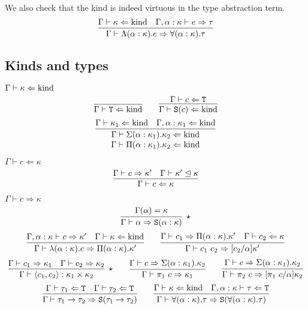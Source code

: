 We also check that the kind is indeed virtuous in the type abstraction term.
\[
  \infer{\Gamma \vdash \Lambda(\alpha : \kappa).e \Rightarrow \forall(\alpha : \kappa).\tau}
    {\Gamma \vdash \kappa \Leftarrow \kind
    &\Gamma, \alpha : \kappa \vdash e \Rightarrow \tau
   }
\]

\subsection{Kinds and types}
\begin{judgment}
  $\Gamma \vdash \kappa \Leftarrow \textnormal{kind}$
  \[
    \infer{\Gamma \vdash \T \Leftarrow \kind}{}
    \qquad
    \infer{\Gamma \vdash \S(c) \Leftarrow \kind}
          {\Gamma \vdash c \Leftarrow \T}
  \]
  \[
    \infer{
      \deduce
        {\Gamma \vdash \Pi(\alpha : \kappa_1).\kappa_2 \Leftarrow \kind}
        {\Gamma \vdash \Sigma(\alpha : \kappa_1).\kappa_2 \Leftarrow \kind}
      }
      {\Gamma \vdash \kappa_1 \Leftarrow \kind
      &\Gamma, \alpha : \kappa_1 \Leftarrow\kind
      }
  \]
\end{judgment}

\begin{judgment}
  $\Gamma \vdash c \Leftarrow \kappa$
  \[
    \infer
      {\Gamma \vdash c \Leftarrow \kappa}
      {\Gamma \vdash c \Rightarrow \kappa'
      &\Gamma \vdash \kappa' \trianglelefteq \kappa
      }
  \]
\end{judgment}

\begin{judgment}
  $\Gamma \vdash c \Rightarrow \kappa$
  \[
    \infer[\star]
      {\Gamma \vdash \alpha \Rightarrow \S(\alpha : \kappa)}
      {\Gamma(\alpha) = \kappa}
  \]
  \[
    \infer{\Gamma \vdash \lambda(\alpha : \kappa).c \Rightarrow \Pi(\alpha : \kappa). \kappa'}
      {\Gamma, \alpha : \kappa \vdash c \Rightarrow \kappa'
      &\Gamma \vdash \kappa \Leftarrow \kind
      }
    \qquad
    \infer{\Gamma \vdash c_1~c_2 \Rightarrow [c_2 / \alpha] \kappa'}
      {\Gamma \vdash c_1 \Rightarrow \Pi(\alpha : \kappa). \kappa'
      &\Gamma \vdash c_2 \Leftarrow \kappa
      }
  \]
  \[
    \infer[\star]{\Gamma \vdash \langle c_1, c_2 \rangle : \kappa_1 \times \kappa_2}
      {\Gamma \vdash c_1 \Rightarrow \kappa_1
      &\Gamma \vdash c_2 \Rightarrow \kappa_2
      }
    \qquad
    \infer{\Gamma \vdash \pi_1~c \Rightarrow \kappa_1}
      {\Gamma \vdash c \Rightarrow \Sigma(\alpha : \kappa_1).\kappa_2}
    \qquad
    \infer{\Gamma \vdash \pi_2~c \Rightarrow [\pi_1~c/\alpha]\kappa_2}
      {\Gamma \vdash c \Rightarrow \Sigma(\alpha : \kappa_1).\kappa_2}
  \]
  \[
    \infer{\Gamma \vdash \tau_1 \rightarrow \tau_2 \Rightarrow \S(\tau_1 \rightarrow \tau_2)}
      {\Gamma \vdash \tau_1 \Leftarrow \T
      &\Gamma \vdash \tau_2 \Leftarrow \T
      }
    \qquad
    \infer
      {\Gamma \vdash \forall (\alpha: \kappa).\tau \Rightarrow \S(\forall(\alpha : \kappa).\tau)}
      {\Gamma \vdash \kappa \Leftarrow \kind
      &\Gamma, \alpha : \kappa \vdash \tau \Leftarrow \T
      }
  \]
\end{judgment}

